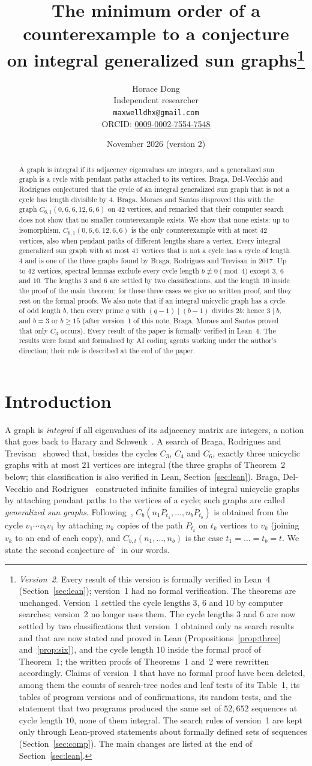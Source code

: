 \documentclass[11pt]{article}
\title{The minimum order of a counterexample to a conjecture\\ on integral
generalized sun graphs\thanks{\emph{Version~2.} Every result of this version
is formally verified in Lean~4 (Section~\ref{sec:lean}); version~1 had no
formal verification. The theorems are unchanged. Version~1 settled the cycle
lengths $3$, $6$ and $10$ by computer searches; version~2 no longer uses them.
The cycle lengths $3$ and $6$ are now settled by two classifications that
version~1 obtained only as search results and that are now stated and proved
in Lean (Propositions~\ref{prop:three} and~\ref{prop:six}), and the cycle
length $10$ inside the formal proof of Theorem~1; the written proofs of
Theorems~1 and~2 were rewritten accordingly. Claims of version~1 that have no
formal proof have been deleted, among them the counts of search-tree nodes and
leaf tests of its Table~1, its tables of program versions and of confirmations,
its random tests, and the statement that two programs produced the same set
of $52{,}652$ sequences at cycle length $10$, none of them integral. The
search rules of version~1 are kept only through Lean-proved statements about
formally defined sets of sequences (Section~\ref{sec:comp}). The main changes
are listed at the end of Section~\ref{sec:lean}.}}
\author{Horace Dong\\ \small Independent researcher\\
\small\texttt{maxwelldhx@gmail.com}\\
\small ORCID: \href{https://orcid.org/0009-0002-7554-7548}{0009-0002-7554-7548}}
\date{November 2026 (version 2)}
\theoremstyle{definition}
\theoremstyle{remark}
\begin{document}
\maketitle
\begin{abstract}
A graph is integral if its adjacency eigenvalues are integers, and a
generalized sun graph is a cycle with pendant paths attached to its vertices.
Braga, Del-Vecchio and Rodrigues conjectured that the
cycle of an integral generalized sun graph that is not a cycle has length
divisible by $4$. Braga, Moraes and Santos disproved this with the graph
$C_{6,1}(0,6,6,12,6,6)$ on $42$ vertices, and remarked that their computer
search does not show that no smaller counterexample exists. We show that
none exists: up to isomorphism, $C_{6,1}(0,6,6,12,6,6)$ is the only
counterexample with at most $42$ vertices, also when pendant paths of
different lengths share a vertex. Every integral generalized sun graph with
at most $41$ vertices that is not a cycle has a cycle of length $4$ and is one
of the three graphs found by Braga, Rodrigues and Trevisan in 2017. Up to $42$
vertices, spectral lemmas exclude every cycle length $b\not\equiv0\pmod 4$
except $3$, $6$ and $10$. The lengths $3$ and $6$ are settled by two
classifications, and the length $10$ inside the proof of the main theorem;
for these three cases we give no written proof, and they rest on the formal
proofs. We also note that if an integral unicyclic graph has a cycle of odd
length $b$, then every prime $q$ with $(q-1)\mid(b-1)$ divides $2b$; hence
$3\mid b$, and $b=3$ or $b\ge15$ (after version~1 of this note, Braga, Moraes
and Santos proved that only $C_3$ occurs). Every result of the paper is formally
verified in Lean~4. The results were found and formalised by AI coding agents
working under the author's direction; their role is described at the end of
the paper.
\end{abstract}

\section{Introduction}

A graph is \emph{integral} if all eigenvalues of its adjacency matrix are
integers, a notion that goes back to Harary and Schwenk~\cite{hs}. A search of
Braga, Rodrigues and Trevisan~\cite{brt} showed that, besides the cycles $C_3$,
$C_4$ and $C_6$, exactly three unicyclic graphs with at most $21$ vertices are
integral (the three graphs of Theorem~2 below; this classification is also
verified in Lean, Section~\ref{sec:lean}). Braga, Del-Vecchio and
Rodrigues~\cite{bdr} constructed infinite families of integral unicyclic
graphs by attaching pendant paths to the vertices of a cycle; such graphs are
called \emph{generalized sun graphs}.
Following~\cite{bms}, $C_b(n_1P_{t_1},\dots,n_bP_{t_b})$ is obtained from the
cycle $v_1\cdots v_bv_1$ by attaching $n_k$ copies of the path $P_{t_k}$ on
$t_k$ vertices to $v_k$ (joining $v_k$ to an end of each copy), and
$C_{b,t}(n_1,\dots,n_b)$ is the case $t_1=\dots=t_b=t$. We state the second
conjecture of~\cite{bdr} in our words.
\end{document}
